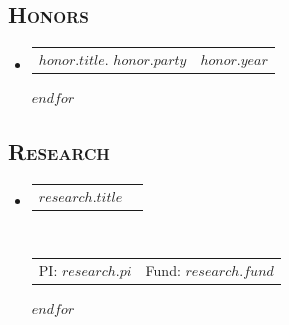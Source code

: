 \documentclass[11pt, letterpaper]{scrartcl}
\makeatletter
\newcommand{\headerrow}[2]
{\begin{tabular*}{\linewidth}{l@{\extracolsep{\fill}}r}
	#1 &
	#2 \\
\end{tabular*}}
\makeatother
\begin{document}
\subsection*{\textsc{Honors}}
\begin{itemize}
    \parskip=0.1em
    
    $for(honor)$
    \item
    \headerrow
    {\textbf{$honor.title$}. $honor.party$}
    {\emph{$honor.year$}}
    $endfor$
\end{itemize}


\subsection*{\textsc{Research}}
\begin{itemize}
    \parskip=0.1em
    
    $for(research)$
    \item
    \headerrow{\textbf{$research.title$}}{}
    \\
    \headerrow{PI: {$research.pi$}}{Fund: {$research.fund$}}
    $endfor$
\end{itemize}
\end{document}
